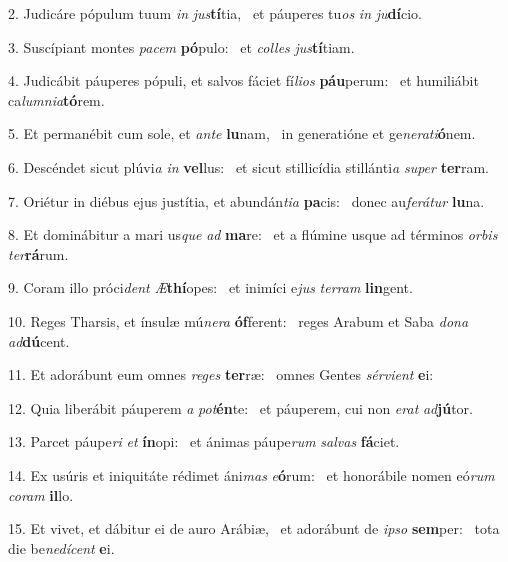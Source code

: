 2. Judicáre pópulum tuum \textit{in} \textit{jus}\textbf{tí}tia, \ast\  et páuperes tu\textit{os} \textit{in} \textit{ju}\textbf{dí}cio.\

3. Suscípiant montes \textit{pa}\textit{cem} \textbf{pó}pulo: \ast\  et \textit{col}\textit{les} \textit{jus}\textbf{tí}tiam.\

4. Judicábit páuperes pópuli, et salvos fáciet fí\textit{li}\textit{os} \textbf{páu}perum: \ast\  et humiliábit ca\textit{lum}\textit{ni}\textit{a}\textbf{tó}rem.\

5. Et permanébit cum sole, et \textit{an}\textit{te} \textbf{lu}nam, \ast\  in generatióne et ge\textit{ne}\textit{ra}\textit{ti}\textbf{ó}nem.\

6. Descéndet sicut plúvi\textit{a} \textit{in} \textbf{vel}lus: \ast\  et sicut stillicídia stillánti\textit{a} \textit{su}\textit{per} \textbf{ter}ram.\

7. Oriétur in diébus ejus justítia, et abundán\textit{ti}\textit{a} \textbf{pa}cis: \ast\  donec au\textit{fe}\textit{rá}\textit{tur} \textbf{lu}na.\

8. Et dominábitur a mari us\textit{que} \textit{ad} \textbf{ma}re: \ast\  et a flúmine usque ad términos \textit{or}\textit{bis} \textit{ter}\textbf{rá}rum.\

9. Coram illo próci\textit{dent} \textit{Æ}\textbf{thí}opes: \ast\  et inimíci e\textit{jus} \textit{ter}\textit{ram} \textbf{lin}gent.\

10. Reges Tharsis, et ínsulæ mú\textit{ne}\textit{ra} \textbf{óf}ferent: \ast\  reges Arabum et Saba \textit{do}\textit{na} \textit{ad}\textbf{dú}cent.\

11. Et adorábunt eum omnes \textit{re}\textit{ges} \textbf{ter}ræ: \ast\  omnes Gentes \textit{sér}\textit{vi}\textit{ent} \textbf{e}i:\

12. Quia liberábit páuperem \textit{a} \textit{pot}\textbf{én}te: \ast\  et páuperem, cui non \textit{e}\textit{rat} \textit{ad}\textbf{jú}tor.\

13. Parcet páupe\textit{ri} \textit{et} \textbf{ín}opi: \ast\  et ánimas páupe\textit{rum} \textit{sal}\textit{vas} \textbf{fá}ciet.\

14. Ex usúris et iniquitáte rédimet áni\textit{mas} \textit{e}\textbf{ó}rum: \ast\  et honorábile nomen eó\textit{rum} \textit{co}\textit{ram} \textbf{il}lo.\

15. Et vivet, et dábitur ei de auro Arábiæ, \dag\  et adorábunt de \textit{ip}\textit{so} \textbf{sem}per: \ast\  tota die be\textit{ne}\textit{dí}\textit{cent} \textbf{e}i.\

